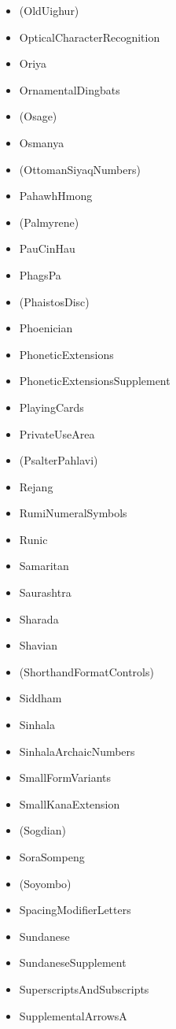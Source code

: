 \documentclass{article}
\newenvironment{itemlist}{%
  \begin{itemize}
  \setlength{\itemsep}{0pt}
  \setlength{\parsep}{0pt}
  \setlength{\topsep}{0pt}
  \setlength{\partopsep}{0pt}
  \setlength{\parskip}{0pt}
  \setlength{\labelsep}{5pt}}%
{
  \end{itemize}}
\begin{document}
\begin{multicols*}{2}
\begin{itemlist}
        \item (OldUighur)
        \item OpticalCharacterRecognition
        \item Oriya
        \item OrnamentalDingbats
        \item (Osage)
        \item Osmanya
        \item (OttomanSiyaqNumbers)
        \item PahawhHmong
        \item (Palmyrene)
        \item PauCinHau
        \item PhagsPa
        \item (PhaistosDisc)
        \item Phoenician
        \item PhoneticExtensions
        \item PhoneticExtensionsSupplement
        \item PlayingCards
        \item PrivateUseArea
        \item (PsalterPahlavi)
        \item Rejang
        \item RumiNumeralSymbols
        \item Runic
        \item Samaritan
        \item Saurashtra
        \item Sharada
        \item Shavian
        \item (ShorthandFormatControls)
        \item Siddham
        \item Sinhala
        \item SinhalaArchaicNumbers
        \item SmallFormVariants
        \item SmallKanaExtension
        \item (Sogdian)
        \item SoraSompeng
        \item (Soyombo)
        \item SpacingModifierLetters
        \item Sundanese
        \item SundaneseSupplement
        \item SuperscriptsAndSubscripts
        \item SupplementalArrowsA

\end{itemlist}
\end{multicols*}
\end{document}

